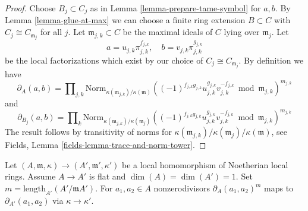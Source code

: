 \begin{proof}
Choose $B_j \subset C_j$ as in
Lemma \ref{lemma-prepare-tame-symbol} for $a, b$.
By Lemma \ref{lemma-glue-at-max} we can choose a finite ring
extension $B \subset C$ with $C_j \cong C_{\mathfrak m_j}$ for all $j$.
Let $\mathfrak m_{j, k} \subset C$ be the maximal ideals of $C$
lying over $\mathfrak m_j$. Let
$$
a = u_{j, k}\pi_{j, k}^{f_{j, k}},\quad
b = v_{j, k}\pi_{j, k}^{g_{j, k}}
$$
be the local factorizations which exist by our choice of
$C_j \cong C_{\mathfrak m_j}$. By definition we have
$$
\partial_A(a, b) = 
\prod\nolimits_{j, k}
\text{Norm}_{\kappa(\mathfrak m_{j, k})/\kappa(\mathfrak m)}
((-1)^{f_{j, k}g_{j, k}}u_{j, k}^{g_{j, k}}v_{j, k}^{-f_{j, k}}
\bmod \mathfrak m_{j, k})^{m_{j, k}}
$$
and
$$
\partial_{B_j}(a, b) = 
\prod\nolimits_k
\text{Norm}_{\kappa(\mathfrak m_{j, k})/\kappa(\mathfrak m_j)}
((-1)^{f_{j, k}g_{j, k}}u_{j, k}^{g_{j, k}}v_{j, k}^{-f_{j, k}}
\bmod \mathfrak m_{j, k})^{m_{j, k}}
$$
The result follows by transitivity of norms
for $\kappa(\mathfrak m_{j, k})/\kappa(\mathfrak m_j)/\kappa(\mathfrak m)$, see
Fields, Lemma \ref{fields-lemma-trace-and-norm-tower}.
\end{proof}

\begin{lemma}
\label{lemma-tame-symbol-formally-smooth}
Let $(A, \mathfrak m, \kappa) \to (A', \mathfrak m', \kappa')$
be a local homomorphism of Noetherian local rings. Assume $A \to A'$
is flat and $\dim(A) = \dim(A') = 1$. Set
$m = \text{length}_{A'}(A'/\mathfrak mA')$.
For $a_1, a_2 \in A$ nonzerodivisors
$\partial_A(a_1, a_2)^m$ maps to $\partial_{A'}(a_1, a_2)$
via $\kappa \to \kappa'$.
\end{lemma}

